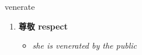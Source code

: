 
\begin{frame}
{\huge venerate}
\begin{center}
\begin{enumerate}\Large
  \item \textbf{尊敬 respect}
  \begin{itemize}
    \item \em{\Large{she is venerated by the public}}
  \end{itemize}
\end{enumerate}
\end{center}
\end{frame}

